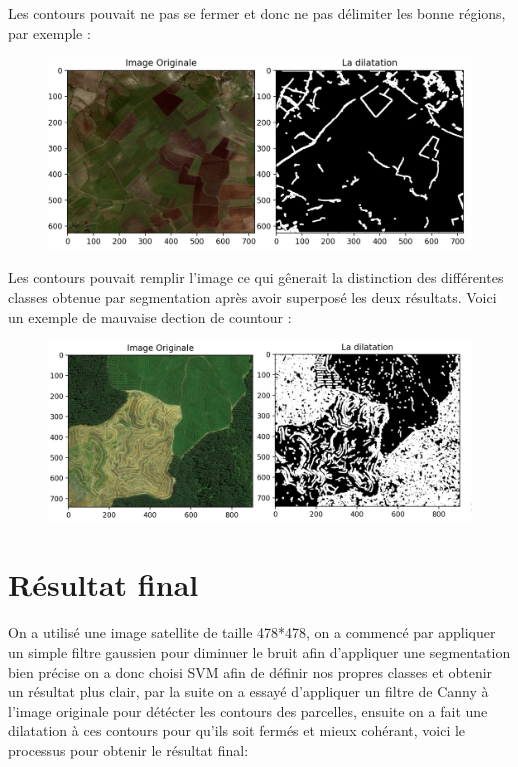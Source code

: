 \documentclass[12pt, openany]{report}
\begin{document}
\begin{mylist}
\item Les contours pouvait ne pas se fermer et donc ne pas délimiter les bonne régions, par exemple : 
    \begin{figure}[H]
    \centering
    \includegraphics[scale=0.47]{contour_ouvert.jpg}
    \end{figure}
\item Les contours pouvait remplir l'image ce qui gênerait la distinction des différentes classes obtenue par segmentation après avoir superposé les deux résultats. Voici un exemple de mauvaise dection de countour : 

    \begin{figure}[H]
    \centering
    \includegraphics[scale=0.47]{contour_grand.jpg}
    \end{figure}


\end{mylist}

\section{Résultat final}

On a utilisé une image satellite de taille 478*478, on a commencé par appliquer un simple filtre gaussien pour diminuer le bruit afin d'appliquer une segmentation bien précise on a donc choisi SVM afin de définir nos propres classes et obtenir un résultat plus clair, par la suite on a essayé d'appliquer un filtre de Canny à l'image originale pour détécter les contours des parcelles, ensuite on a fait une dilatation à ces contours pour qu'ils soit fermés et mieux cohérant, voici le processus pour obtenir le résultat final: 
\end{document}
